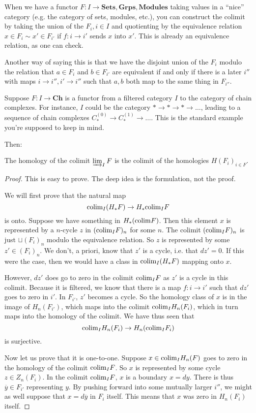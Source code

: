When we have a functor $F: I \to \mathbf{Sets}, \mathbf{Grps},
\mathbf{Modules}$ taking values in a ``nice'' category (e.g. the category of
sets, modules, etc.), you can construct the colimit by taking the union of the
$F_i, i \in I$ and quotienting by the equivalence relation $x \in F_i \sim x'
\in F_{i'}$ if $f: i \to i'$ sends $x$ into $x'$. This is already an
equivalence relation, as one can check. 

Another way of saying this is that we have the disjoint union of the $F_i$
modulo the relation that $a \in F_i$ and $b \in F_{i'}$ are equivalent if and
only if there is a later $i''$ with maps $i \to i'', i' \to i''$ such that
$a,b$ both map to the same thing in $F_{i''}$. 


Suppose $F: I \to \mathbf{Ch}$ is a functor from a filtered category $I$ to the
category of chain complexes. For instance, $I$ could be the category $\ast \to
\ast \to \ast \to \dots$, leading to  a sequence of chain complexes
$C_*^{(0)}\to C_{*}^{(1)} \to \dots$.  This is the standard example you're
supposed to keep in mind. 

Then:
\begin{proposition} 
The homology of the colimit $\varinjlim_I F$ is the colimit of the homologies
$H(F_i)_{i \in F}$.
\end{proposition} 

\begin{proof} 
This is easy to prove. The deep idea is the formulation, not the proof. 

We will first prove that the  natural map
\[ \mathrm{colim}_I (H_*F) \to H_* \mathrm{colim}_I F   \]
is onto. Suppose we have something in $H_*(\mathrm{colim} F)$. Then this element $x$ is
represented by a $n$-cycle $z$ in $(\mathrm{colim}_I F)_n$ for some $n$. The colimit
$(\mathrm{colim}_I F)_n$ is just $\sqcup (F_i)_n$ modulo the equivalence relation. 
So $z$ is represented by some $z' \in (F_i)_n$. We don't, a priori, know that
$z'$ is a cycle, i.e. that $dz' = 0$. If this were the case, then we would have
a class in $\mathrm{colim}_I (H_* F)$ mapping onto $x$.

However, $dz'$ does go to zero in the colimit $\mathrm{colim}_I F$ as $z'$ is a cycle
in this colimit. Because it is filtered, we know that there is a map $f:i \to
i'$ such that $dz'$ goes to zero in $i'$. 
In $F_{i'}$, $z'$ becomes a cycle.  So the homology class of $x$ is in the
image of $H_n(F_{i'})$, which maps into the colimit $\mathrm{colim}_I H_n(F_i)$, which
in turn maps into the homology of the colimit. We have thus seen that
\[ \mathrm{colim}_I H_n(F_i) \to H_n(\mathrm{colim}_I F_i)  \]
is surjective. 

Now let us prove that it is one-to-one. Suppose $x \in \mathrm{colim}_I H_n(F)$ 
goes to zero in the homology of the colimit $\mathrm{colim}_I F$. So $x$ is represented
by some cycle $z \in Z_n(F_i)$.  In the colimit $\mathrm{colim}_I F$, $x$ is a
boundary $x = dy$. There is thus $\overline{y} \in F_{i'}$ representing $y$. 
By pushing forward into some mutually larger $i''$, we might as well suppose that $x = d
\overline{y}$ in
$F_i$ itself. This means that $x$ was zero in $H_n(F_i)$ itself.
\end{proof} 

